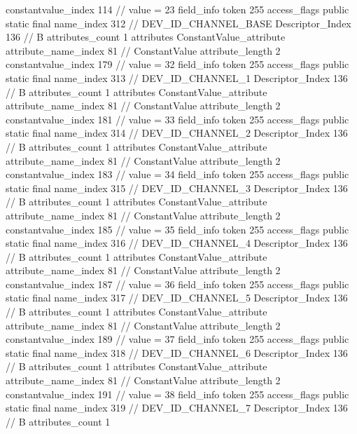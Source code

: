 {{{{{{{					constantvalue_index	114		// value = 23
				}
				}
			}
			field_info {
				token	255
				access_flags	public static final
				name_index	312		// DEV_ID_CHANNEL_BASE
				Descriptor_Index	136		// B
				attributes_count	1
				attributes {
				ConstantValue_attribute {
					attribute_name_index	81		// ConstantValue
					attribute_length	2
					constantvalue_index	179		// value = 32
				}
				}
			}
			field_info {
				token	255
				access_flags	public static final
				name_index	313		// DEV_ID_CHANNEL_1
				Descriptor_Index	136		// B
				attributes_count	1
				attributes {
				ConstantValue_attribute {
					attribute_name_index	81		// ConstantValue
					attribute_length	2
					constantvalue_index	181		// value = 33
				}
				}
			}
			field_info {
				token	255
				access_flags	public static final
				name_index	314		// DEV_ID_CHANNEL_2
				Descriptor_Index	136		// B
				attributes_count	1
				attributes {
				ConstantValue_attribute {
					attribute_name_index	81		// ConstantValue
					attribute_length	2
					constantvalue_index	183		// value = 34
				}
				}
			}
			field_info {
				token	255
				access_flags	public static final
				name_index	315		// DEV_ID_CHANNEL_3
				Descriptor_Index	136		// B
				attributes_count	1
				attributes {
				ConstantValue_attribute {
					attribute_name_index	81		// ConstantValue
					attribute_length	2
					constantvalue_index	185		// value = 35
				}
				}
			}
			field_info {
				token	255
				access_flags	public static final
				name_index	316		// DEV_ID_CHANNEL_4
				Descriptor_Index	136		// B
				attributes_count	1
				attributes {
				ConstantValue_attribute {
					attribute_name_index	81		// ConstantValue
					attribute_length	2
					constantvalue_index	187		// value = 36
				}
				}
			}
			field_info {
				token	255
				access_flags	public static final
				name_index	317		// DEV_ID_CHANNEL_5
				Descriptor_Index	136		// B
				attributes_count	1
				attributes {
				ConstantValue_attribute {
					attribute_name_index	81		// ConstantValue
					attribute_length	2
					constantvalue_index	189		// value = 37
				}
				}
			}
			field_info {
				token	255
				access_flags	public static final
				name_index	318		// DEV_ID_CHANNEL_6
				Descriptor_Index	136		// B
				attributes_count	1
				attributes {
				ConstantValue_attribute {
					attribute_name_index	81		// ConstantValue
					attribute_length	2
					constantvalue_index	191		// value = 38
				}
				}
			}
			field_info {
				token	255
				access_flags	public static final
				name_index	319		// DEV_ID_CHANNEL_7
				Descriptor_Index	136		// B
				attributes_count	1
}}}}}
